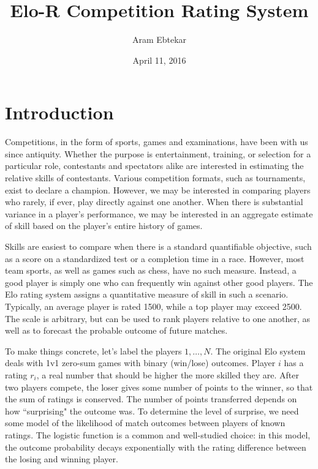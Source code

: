 \documentclass{article}
\title{Elo-R Competition Rating System}
\author{Aram Ebtekar}
\date{April 11, 2016}
\begin{document}
\maketitle

\section{Introduction}

Competitions, in the form of sports, games and examinations, have been with us since antiquity. Whether the purpose is entertainment, training, or selection for a particular role, contestants and spectators alike are interested in estimating the relative skills of contestants. Various competition formats, such as tournaments, exist to declare a champion. However, we may be interested in comparing players who rarely, if ever, play directly against one another. When there is substantial variance in a player's performance, we may be interested in an aggregate estimate of skill based on the player's entire history of games.

Skills are easiest to compare when there is a standard quantifiable objective, such as a score on a standardized test or a completion time in a race.  However, most team sports, as well as games such as chess, have no such measure. Instead, a good player is simply one who can frequently win against other good players. The Elo rating system assigns a quantitative measure of skill in such a scenario. Typically, an average player is  rated 1500, while a top player may exceed 2500. The scale is arbitrary, but can be used to rank players relative to one another, as well as to forecast the probable outcome of future matches.

To make things concrete, let's label the players $1,\ldots,N$. The original Elo system deals with 1v1 zero-sum games with binary (win/lose) outcomes. Player $i$ has a rating $r_i$, a real number that should be higher the more skilled they are. After two players compete, the loser gives some number of points to the winner, so that the sum of ratings is conserved. The number of points transferred depends on how ``surprising" the outcome was. To determine the level of surprise, we need some model of the likelihood of match outcomes between players of known ratings. The logistic function is a common and well-studied choice: in this model, the outcome probability decays exponentially with the rating difference between the losing and winning player.
\end{document}
